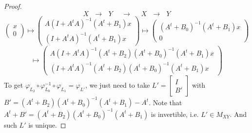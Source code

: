 \documentclass{article}
\begin{document}
\begin{proof}
\[
X  ~  ~   ~ \longrightarrow  ~  ~   ~ Y  ~  ~   ~ ~  ~   ~\longrightarrow ~  ~   ~ ~  ~   ~ X~  ~   ~ \longrightarrow  ~  ~   ~ Y
\]
\[
\left(
\begin{array}{cc}
x \\
0 \end{array} \right) \mapsto   \left(
\begin{array}{cc}
A(I+A^tA)^{-1}(A^t+B_1)x \\
(I+A^tA)^{-1}(A^t+B_1)x \end{array} \right)
\mapsto   \left(
\begin{array}{cc}
(A^t+B_0)^{-1}(A^t+B_1)x \\
0 \end{array} \right)
\]
\[
 \mapsto   \left(
\begin{array}{cc}
A(I+A^tA)^{-1}(A^t+B_2)(A^t+B_0)^{-1}(A^t+B_1)x \\
(I+A^tA)^{-1}(A^t+B_2)(A^t+B_0)^{-1}(A^t+B_1)x \end{array} \right)
\]
To get $\varphi_{L_2}\circ \varphi_{L_0}^{-1}\circ \varphi_{L_1}=\varphi_{L'}$, we just need to take $L'=\left[
\begin{array}{cc}
I \\
B' \end{array} \right]$ with $B'=(A^t+B_2)(A^t+B_0)^{-1}(A^t+B_1)-A^t$. Note that $A^t+B'=(A^t+B_2)(A^t+B_0)^{-1}(A^t+B_1)$ is invertible,
i.e. $L' \in M_{XY}$. And such $L'$ is unique.
\end{proof}
\end{document}
